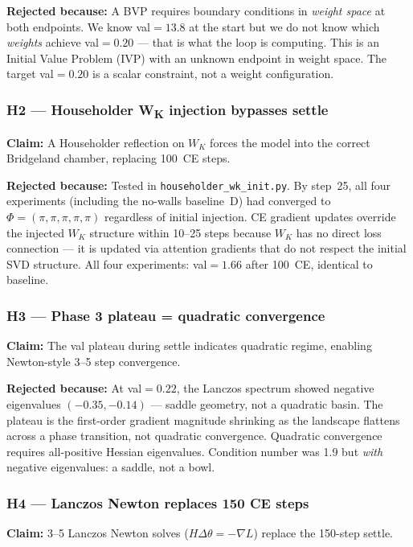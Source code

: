 \documentclass[11pt]{amsart}
\begin{document}
\textbf{Rejected because:} A BVP requires boundary conditions in
\emph{weight space} at both endpoints.
We know val$=13.8$ at the start but we do not know which \emph{weights}
achieve val$=0.20$ — that is what the loop is computing.
This is an Initial Value Problem (IVP) with an unknown endpoint in
weight space.
The target val$=0.20$ is a scalar constraint, not a weight configuration.

\subsubsection*{H2 — Householder W\textsubscript{K} injection bypasses settle}

\textbf{Claim:} A Householder reflection on $W_K$ forces the model into
the correct Bridgeland chamber, replacing 100~CE steps.

\textbf{Rejected because:} Tested in \texttt{householder\_wk\_init.py}.
By step~25, all four experiments (including the no-walls baseline~D)
had converged to $\Phi=(\pi,\pi,\pi,\pi,\pi)$ regardless of initial injection.
CE gradient updates override the injected $W_K$ structure within 10--25 steps
because $W_K$ has no direct loss connection —
it is updated via attention gradients that do not respect the initial SVD structure.
All four experiments: val$=1.66$ after 100~CE, identical to baseline.

\subsubsection*{H3 — Phase 3 plateau = quadratic convergence}

\textbf{Claim:} The val plateau during settle indicates quadratic regime,
enabling Newton-style 3--5 step convergence.

\textbf{Rejected because:} At val$=0.22$, the Lanczos spectrum showed
negative eigenvalues $(-0.35, -0.14)$ — saddle geometry, not a quadratic basin.
The plateau is the first-order gradient magnitude shrinking as the landscape
flattens across a phase transition, not quadratic convergence.
Quadratic convergence requires all-positive Hessian eigenvalues.
Condition number was 1.9 but \emph{with} negative eigenvalues:
a saddle, not a bowl.

\subsubsection*{H4 — Lanczos Newton replaces 150 CE steps}

\textbf{Claim:} 3--5 Lanczos Newton solves ($H\Delta\theta = -\nabla L$)
replace the 150-step settle.
\end{document}

